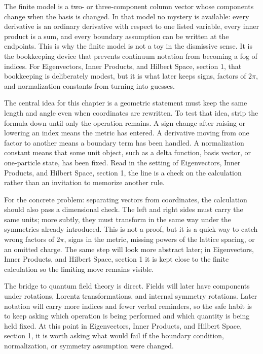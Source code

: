 The finite model is a two- or three-component column vector whose components change when the basis is changed.  In that model no mystery is available: every derivative is an ordinary derivative with respect to one listed variable, every inner product is a sum, and every boundary assumption can be written at the endpoints.  This is why the finite model is not a toy in the dismissive sense.  It is the bookkeeping device that prevents continuum notation from becoming a fog of indices.  For Eigenvectors, Inner Products, and Hilbert Space, section 1, that bookkeeping is deliberately modest, but it is what later keeps signs, factors of \(2\pi\), and normalization constants from turning into guesses.

The central idea for this chapter is a geometric statement must keep the same length and angle even when coordinates are rewritten.  To test that idea, strip the formula down until only the operation remains.  A sign change after raising or lowering an index means the metric has entered.  A derivative moving from one factor to another means a boundary term has been handled.  A normalization constant means that some unit object, such as a delta function, basis vector, or one-particle state, has been fixed.  Read in the setting of Eigenvectors, Inner Products, and Hilbert Space, section 1, the line is a check on the calculation rather than an invitation to memorize another rule.

For the concrete problem: separating vectors from coordinates, the calculation should also pass a dimensional check.  The left and right sides must carry the same units; more subtly, they must transform in the same way under the symmetries already introduced.  This is not a proof, but it is a quick way to catch wrong factors of \(2\pi\), signs in the metric, missing powers of the lattice spacing, or an omitted charge.  The same step will look more abstract later; in Eigenvectors, Inner Products, and Hilbert Space, section 1 it is kept close to the finite calculation so the limiting move remains visible.

The bridge to quantum field theory is direct.  Fields will later have components under rotations, Lorentz transformations, and internal symmetry rotations.  Later notation will carry more indices and fewer verbal reminders, so the safe habit is to keep asking which operation is being performed and which quantity is being held fixed.  At this point in Eigenvectors, Inner Products, and Hilbert Space, section 1, it is worth asking what would fail if the boundary condition, normalization, or symmetry assumption were changed.

